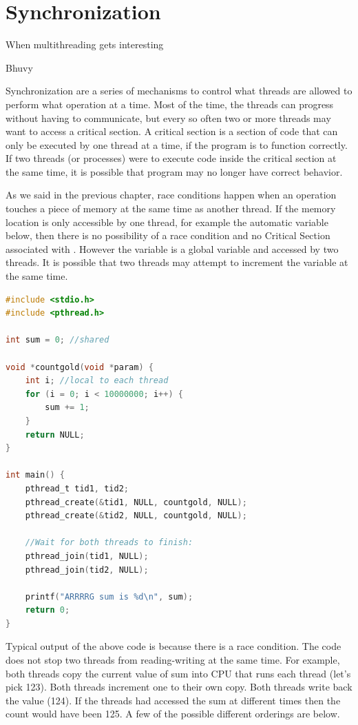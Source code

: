 \chapter{Synchronization}

\epigraph{When multithreading gets interesting}{Bhuvy}

Synchronization are a series of mechanisms to control what threads are allowed to perform what operation at a time.
Most of the time, the threads can progress without having to communicate, but every so often two or more threads may want to access a critical section.
A critical section is a section of code that can only be executed by one thread at a time, if the program is to function correctly.
If two threads (or processes) were to execute code inside the critical section at the same time, it is possible that program may no longer have correct behavior.

As we said in the previous chapter, race conditions happen when an operation touches a piece of memory at the same time as another thread.
If the memory location is only accessible by one thread, for example the automatic variable  below, then there is no possibility of a race condition and no Critical Section associated with .
However the  variable is a global variable and accessed by two threads.
It is possible that two threads may attempt to increment the variable at the same time.

\begin{lstlisting}[language=C]
#include <stdio.h>
#include <pthread.h>

int sum = 0; //shared

void *countgold(void *param) {
    int i; //local to each thread
    for (i = 0; i < 10000000; i++) {
        sum += 1;
    }
    return NULL;
}

int main() {
    pthread_t tid1, tid2;
    pthread_create(&tid1, NULL, countgold, NULL);
    pthread_create(&tid2, NULL, countgold, NULL);

    //Wait for both threads to finish:
    pthread_join(tid1, NULL);
    pthread_join(tid2, NULL);

    printf("ARRRRG sum is %d\n", sum);
    return 0;
}
\end{lstlisting}

Typical output of the above code is  because there is a race condition.
The code does not stop two threads from reading-writing  at the same time.
For example, both threads copy the current value of sum into CPU that runs each thread (let's pick 123).
Both threads increment one to their own copy.
Both threads write back the value (124).
If the threads had accessed the sum at different times then the count would have been 125.
A few of the possible different orderings are below.

